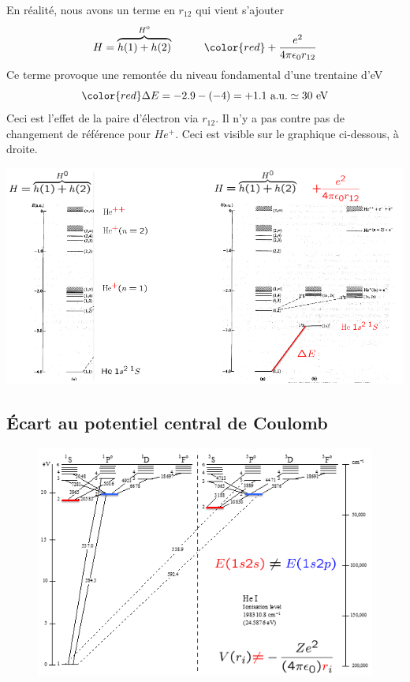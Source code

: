 En réalité, nous avons un terme en $r_{12}$ qui vient s'ajouter
\begin{equation}
H = \overbrace{h(1) + h(2)}^{H^0} \hspace*{1cm}
{\color{red}  + \frac{e^2}{4 \pi \epsilon_0 r_{12}}}
\end{equation}
Ce terme provoque une remontée du niveau fondamental d'une trentaine d'eV $${\color{red} \Delta E =
-2.9 - (-4)= +1.1~\mbox{a.u.} \simeq 30~\mbox{eV} }$$ Ceci est l'effet de la paire d'électron via
$r_{12}$. Il n'y a pas contre pas de changement de référence pour $He^+$. Ceci est visible sur le 
graphique ci-dessous, à droite.
\begin{center}
\includegraphics[scale=0.6]{ch3/image1}
\end{center}


\subsection{Écart au potentiel central de Coulomb}
	\begin{figure}
	\vspace{-7mm}
	\includegraphics[scale=0.5]{ch3/image2}
	\end{figure}


